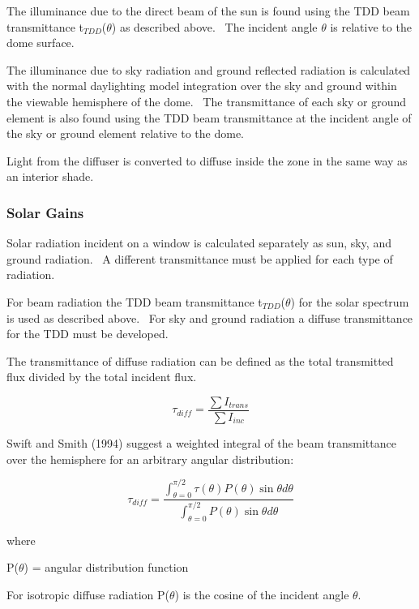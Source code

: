 The illuminance due to the direct beam of the sun is found using the TDD beam transmittance t\(_{TDD}\)(\(\theta\)) as described above.~ The incident angle \(\theta\) is relative to the dome surface.

The illuminance due to sky radiation and ground reflected radiation is calculated with the normal daylighting model integration over the sky and ground within the viewable hemisphere of the dome.~ The transmittance of each sky or ground~ element is also found using the TDD beam transmittance at the incident angle of the sky or ground element relative to the dome.

Light from the diffuser is converted to diffuse inside the zone in the same way as an interior shade.

\subsubsection{Solar Gains}\label{solar-gains}

Solar radiation incident on a window is calculated separately as sun, sky, and ground radiation.~ A different transmittance must be applied for each type of radiation.

For beam radiation the TDD beam transmittance t\(_{TDD}\)(\(\theta\)) for the solar spectrum is used as described above.~ For sky and ground radiation a diffuse transmittance for the TDD must be developed.

The transmittance of diffuse radiation can be defined as the total transmitted flux divided by the total incident flux.

\begin{equation}
{\tau_{diff}} = \frac{{\sum {{I_{trans}}} }}{{\sum {{I_{inc}}} }}
\end{equation}

Swift and Smith (1994) suggest a weighted integral of the beam transmittance over the hemisphere for an arbitrary angular distribution:

\begin{equation}
{\tau_{diff}} = \frac{{\int_{\theta  = 0}^{\pi /2} {\tau (\theta )P(\theta )} \sin \theta d\theta }}{{\int_{\theta  = 0}^{\pi /2} {P(\theta )} \sin \theta d\theta }}
\end{equation}

where

P(\(\theta\)) = angular distribution function

For isotropic diffuse radiation P(\(\theta\)) is the cosine of the incident angle \(\theta\).

